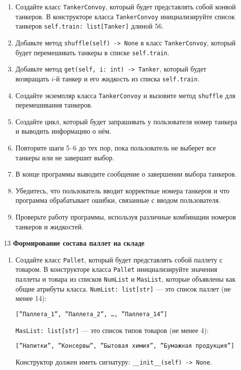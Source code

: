\begin{enumerate}
\begin{enumerate}
    \item Создайте класс \texttt{TankerConvoy}, который будет представлять собой конвой танкеров. В конструкторе класса \texttt{TankerConvoy} инициализируйте список танкеров \texttt{self.train: list[Tanker]} длиной 56.

    \item Добавьте метод \texttt{shuffle(self) -> None} в класс \texttt{TankerConvoy}, который будет перемешивать танкеры в списке \texttt{self.train}.

    \item Добавьте метод \texttt{get(self, i: int) -> Tanker}, который будет возвращать $i$-й танкер и его жидкость из списка \texttt{self.train}.

    \item Создайте экземпляр класса \texttt{TankerConvoy} и вызовите метод \texttt{shuffle} для перемешивания танкеров.

    \item Создайте цикл, который будет запрашивать у пользователя номер танкера и выводить информацию о нём.

    \item Повторите шаги 5–6 до тех пор, пока пользователь не выберет все танкеры или не завершит выбор.

    \item В конце программы выводите сообщение о завершении выбора танкеров.

    \item Убедитесь, что пользователь вводит корректные номера танкеров и что программа обрабатывает ошибки, связанные с вводом пользователя.

    \item Проверьте работу программы, используя различные комбинации номеров танкеров и жидкостей.
\end{enumerate}

\item[13] \textbf{Формирование состава паллет на складе}
\begin{enumerate}
    \item Создайте класс \texttt{Pallet}, который будет представлять собой паллету с товаром. В конструкторе класса \texttt{Pallet} инициализируйте значения паллеты и товара из списков \texttt{NumList} и \texttt{MasList}, которые объявлены как общие атрибуты класса. \texttt{NumList: list[str]} — это список паллет (не менее 14): 
    \begin{center}
        \texttt{[''Паллета\_1'', ''Паллета\_2'', \dots, ''Паллета\_14'']}
    \end{center}
    \texttt{MasList: list[str]} — это список типов товаров (не менее 4):
    \begin{center}
        \texttt{[''Напитки'', ''Консервы'', ''Бытовая химия'', ''Бумажная продукция'']}
    \end{center}
    Конструктор должен иметь сигнатуру: \texttt{\_\_init\_\_(self) -> None}.


\end{enumerate}
\end{enumerate}
